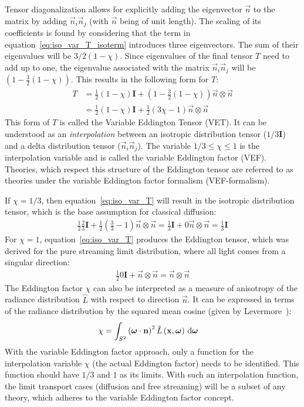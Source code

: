 Tensor diagonalization allows for explicitly adding the eigenvector $\vec{n}$ to the matrix by adding $\vec{n}_i\vec{n}_j$ (with $\vec{n}$ being of unit length). The scaling of its coefficients is found by considering that the term in equation~\ref{eq:iso_var_T_isoterm} introduces three eigenvectors. The sum of their eigenvalues will be $3/2(1-\chi)$. Since eigenvalues of the final tensor $T$ need to add up to one, the eigenvalue associated with the matrix $\vec{n}_i\vec{n}_j$ will be $\left(1- \frac{3}{2}\left(1 - \chi\right)\right)$. This results in the following form for $T$:
\begin{align}
T &= \frac{1}{2}\left(1-\chi\right)\mathbf{I} + \left(1- \frac{3}{2}\left(1 - \chi\right)\right) \vec{n}\otimes\vec{n}
\nonumber
\\
&= \frac{1}{2}\left(1-\chi\right)\mathbf{I} + \frac{1}{2}\left(3\chi-1\right) \vec{n}\otimes\vec{n}
\label{eq:iso_var_T}
\end{align}
This form of $T$ is called the Variable Eddington Tensor (VET). It can be understood as an \emph{interpolation} between an isotropic distribution tensor ($1/3\mathbf{I}$) and a delta distribution tensor ($\vec{n}_i\vec{n}_j$). The variable $1/3 \le \chi \le 1$ is the interpolation variable and is called the variable Eddington factor (VEF). Theories, which respect this structure of the Eddington tensor are referred to as theories under the variable Eddington factor formalism (VEF-formalism).

If $\chi=1/3$, then equation~\ref{eq:iso_var_T} will result in the isotropic distribution tensor, which is the base assumption for classical diffusion:
\begin{align}
\frac{1}{2}\frac{2}{3}\mathbf{I} + \frac{1}{2}\left(\frac{3}{3}-1\right) \vec{n}\otimes\vec{n}
=\frac{1}{3}\mathbf{I} + 0\vec{n}\otimes\vec{n} = \frac{1}{3}\mathbf{I}
\end{align}
For $\chi=1$, equation~\ref{eq:iso_var_T} produces the Eddington tensor, which was derived for the pure streaming limit distribution, where all light comes from a singular direction:
\begin{align}
\frac{1}{2}0\mathbf{I} + \vec{n}\otimes\vec{n}
= \vec{n}\otimes\vec{n}
\end{align}
The Eddington factor $\chi$ can also be interpreted as a measure of anisotropy of the radiance distribution $\widehat{L}$ with respect to direction $\vec{n}$. It can be expressed in terms of the radiance distribution by the squared mean cosine (given by Levermore~\cite{Levermore84}):
\begin{align}
\chi &= \int_{S^2}{ \left(\boldsymbol{\mathbf{\omega}}\cdot\boldsymbol{\mathbf{n}}\right)^2\hat{L}\left(\boldsymbol{\mathbf{x}}, \boldsymbol{\mathbf{\omega}}\right)\,\mathrm{d}\boldsymbol{\mathbf{\omega}}}
\label{eq:iso_var_chi}
\end{align}
With the variable Eddington factor approach, only a function for the interpolation variable $\chi$ (the actual Eddington factor) needs to be identified. This function should have $1/3$ and $1$ as its limits. With such an interpolation function, the limit transport cases (diffusion and free streaming) will be a subset of any theory, which adheres to the variable Eddington factor concept.

